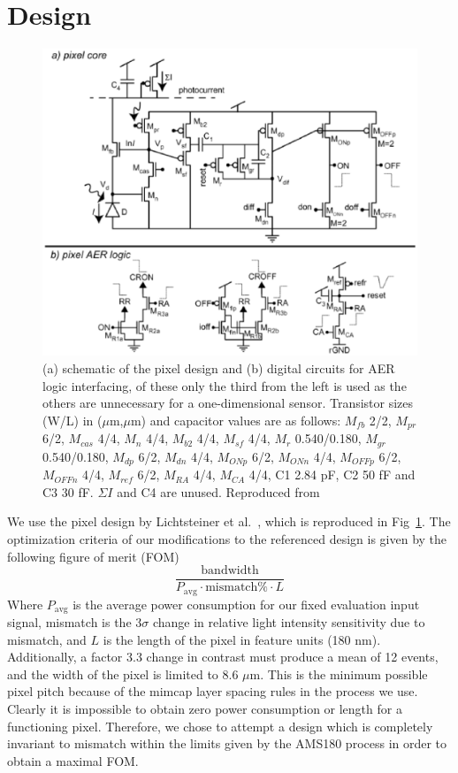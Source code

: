 \section{Design}
\begin{figure}
    \center
    \includegraphics[trim={4.5cm 0 4.5cm 0},clip,width=\textwidth]{pixel-design.eps}
    \caption{(a) schematic of the pixel design and (b) digital circuits for AER logic interfacing, of these only the 
    third from the left is used as the others are unnecessary for a one-dimensional sensor. Transistor sizes (W/L) in
    (\(\mu\)m,\(\mu\)m) and capacitor values are as follows: \(M_{fb}\) 2/2, \(M_{pr}\) 6/2, \(M_{cas}\) 4/4, \(M_n\) 4/4,
    \(M_{b2}\) 4/4, \(M_{sf}\) 4/4, \(M_r\) 0.540/0.180, \(M_{gr}\) 0.540/0.180, \(M_{dp}\) 6/2, \(M_{dn}\) 4/4,
    \(M_{ONp}\) 6/2, \(M_{ONn}\) 4/4, \(M_{OFFp}\) 6/2, \(M_{OFFn}\) 4/4, \(M_{ref}\) 6/2, \(M_{RA}\) 4/4, \(M_{CA}\) 4/4,
    C1 2.84 pF, C2 50 fF and C3 30 fF. \(\Sigma I\) and C4 are unused. Reproduced from~\cite{Lichtsteiner2008}}
    \label{fig:pixel-design}
\end{figure}
We use the pixel design by Lichtsteiner et al.~\cite{Lichtsteiner2008}, which is reproduced in Fig~\ref{fig:pixel-design}.
The optimization criteria of our modifications to the referenced design is given by the following figure of merit (FOM)
\begin{equation*}
    \frac{\text{bandwidth}}{P_{\text{avg}}\cdot \text{mismatch\%}\cdot L}
\end{equation*}
Where \(P_{\text{avg}}\) is the average power consumption for our fixed evaluation input signal, mismatch is the 
\(3\sigma\) change in relative light intensity sensitivity due to mismatch, and \(L\) is the length of the pixel in feature units (180 nm).
Additionally, a factor 3.3 change in contrast must produce a mean of 12 events, and the width of the pixel is
limited to 8.6 \(\mu\)m. This is the minimum possible pixel pitch because of the mimcap layer spacing rules in the 
process we use.
Clearly it is impossible to obtain zero power consumption or length for a functioning pixel.
Therefore, we chose to attempt a design which is completely invariant to mismatch within the limits given by
the AMS180 process in order to obtain a maximal FOM. 

